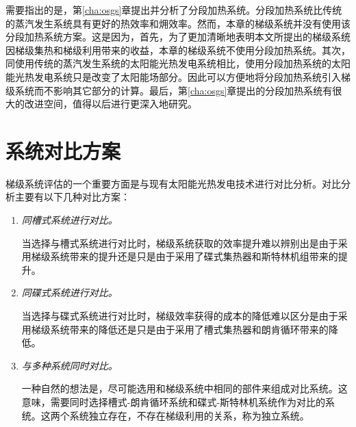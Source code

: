 需要指出的是，第\ref{cha:osgs}章提出并分析了分段加热系统。分段加热系统比传统的蒸汽发生系统具有更好的热效率和㶲效率。然而，本章的梯级系统并没有使用该分段加热系统方案。这是因为，首先，为了更加清晰地表明本文所提出的梯级系统因梯级集热和梯级利用带来的收益，本章的梯级系统不使用分段加热系统。其次，同使用传统的蒸汽发生系统的太阳能光热发电系统相比，使用分段加热系统的太阳能光热发电系统只是改变了太阳能场部分。因此可以方便地将分段加热系统引入梯级系统而不影响其它部分的计算。最后，第\ref{cha:osgs}章提出的分段加热系统有很大的改进空间，值得以后进行更深入地研究。

\section{系统对比方案}

梯级系统评估的一个重要方面是与现有太阳能光热发电技术进行对比分析。对比分析主要有以下几种对比方案：

\begin{enumerate}[label=(\arabic*)]
	\item \emph{同槽式系统进行对比。} 

	\setlength\parindent{2em}当选择与槽式系统进行对比时，梯级系统获取的效率提升难以辨别出是由于采用梯级系统带来的提升还是只是由于采用了碟式集热器和斯特林机组带来的提升。
	\item \emph{同碟式系统进行对比。}
	
	当选择与碟式系统进行对比时，梯级效率获得的成本的降低难以区分是由于采用梯级系统带来的降低还是只是由于采用了槽式集热器和朗肯循环带来的降低。
	\item \emph{与多种系统同时对比。}
	
	一种自然的想法是，尽可能选用和梯级系统中相同的部件来组成对比系统。这意味，需要同时选择槽式-朗肯循环系统和碟式-斯特林机系统作为对比的系统。这两个系统独立存在，不存在梯级利用的关系，称为独立系统。
	
\end{enumerate}

